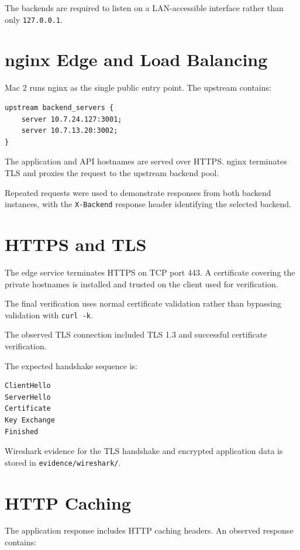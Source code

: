 \documentclass[11pt,a4paper]{article}
\begin{document}
The backends are required to listen on a LAN-accessible interface rather
than only \texttt{127.0.0.1}.

\section{nginx Edge and Load Balancing}

Mac 2 runs nginx as the single public entry point. The upstream contains:

\begin{lstlisting}
upstream backend_servers {
    server 10.7.24.127:3001;
    server 10.7.13.20:3002;
}
\end{lstlisting}

The application and API hostnames are served over HTTPS. nginx terminates
TLS and proxies the request to the upstream backend pool.

Repeated requests were used to demonstrate responses from both backend
instances, with the \texttt{X-Backend} response header identifying the
selected backend.

\section{HTTPS and TLS}

The edge service terminates HTTPS on TCP port 443. A certificate covering
the private hostnames is installed and trusted on the client used for
verification.

The final verification uses normal certificate validation rather than
bypassing validation with \texttt{curl -k}.

The observed TLS connection included TLS 1.3 and successful certificate
verification.

The expected handshake sequence is:

\begin{lstlisting}
ClientHello
ServerHello
Certificate
Key Exchange
Finished
\end{lstlisting}

Wireshark evidence for the TLS handshake and encrypted application data
is stored in \texttt{evidence/wireshark/}.

\section{HTTP Caching}

The application response includes HTTP caching headers. An observed
response contains:
\end{document}
